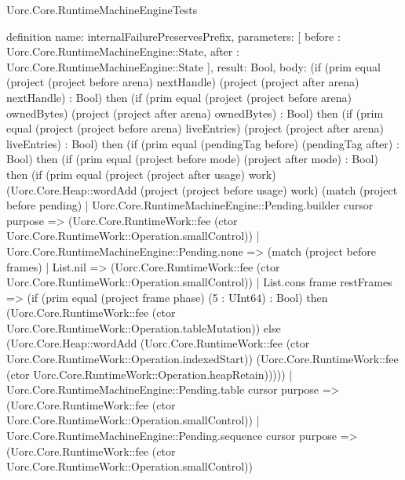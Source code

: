 \begin{lexlean}{Uorc.Core.RuntimeMachineEngineTests}
\begin{semanticmodule}
definition{
  name: internalFailurePreservesPrefix,
  parameters: [
    before : Uorc.Core.RuntimeMachineEngine::State,
    after : Uorc.Core.RuntimeMachineEngine::State
  ],
  result: Bool,
  body: (if (prim equal (project (project before arena) nextHandle) (project (project after arena) nextHandle) : Bool) then (if (prim equal (project (project before arena) ownedBytes) (project (project after arena) ownedBytes) : Bool) then (if (prim equal (project (project before arena) liveEntries) (project (project after arena) liveEntries) : Bool) then (if (prim equal (pendingTag before) (pendingTag after) : Bool) then (if (prim equal (project before mode) (project after mode) : Bool) then (if (prim equal (project (project after usage) work) (Uorc.Core.Heap::wordAdd (project (project before usage) work) (match (project before pending)
    | Uorc.Core.RuntimeMachineEngine::Pending.builder cursor purpose => (Uorc.Core.RuntimeWork::fee (ctor Uorc.Core.RuntimeWork::Operation.smallControl))
    | Uorc.Core.RuntimeMachineEngine::Pending.none => (match (project before frames)
      | List.nil => (Uorc.Core.RuntimeWork::fee (ctor Uorc.Core.RuntimeWork::Operation.smallControl))
      | List.cons frame restFrames => (if (prim equal (project frame phase) (5 : UInt64) : Bool) then (Uorc.Core.RuntimeWork::fee (ctor Uorc.Core.RuntimeWork::Operation.tableMutation)) else (Uorc.Core.Heap::wordAdd (Uorc.Core.RuntimeWork::fee (ctor Uorc.Core.RuntimeWork::Operation.indexedStart)) (Uorc.Core.RuntimeWork::fee (ctor Uorc.Core.RuntimeWork::Operation.heapRetain)))))
    | Uorc.Core.RuntimeMachineEngine::Pending.table cursor purpose => (Uorc.Core.RuntimeWork::fee (ctor Uorc.Core.RuntimeWork::Operation.smallControl))
    | Uorc.Core.RuntimeMachineEngine::Pending.sequence cursor purpose => (Uorc.Core.RuntimeWork::fee (ctor Uorc.Core.RuntimeWork::Operation.smallControl))
}
\end{semanticmodule}
\end{lexlean}
